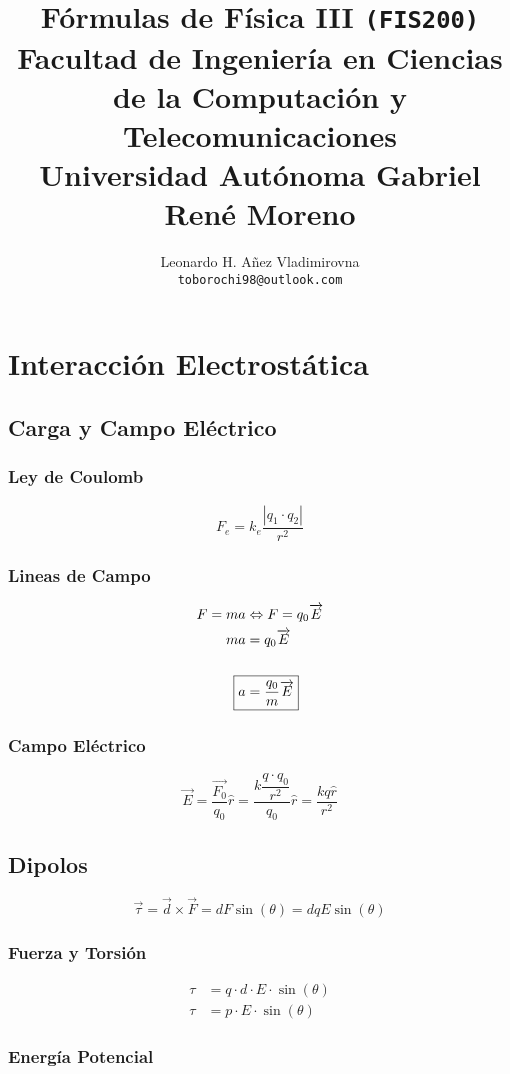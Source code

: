 \documentclass[10pt,letterpaper]{article}
\author{Leonardo H. Añez Vladimirovna\\
\texttt{toborochi98@outlook.com}
}
\title{Fórmulas de Física III \texttt{(FIS200)}\\{\normalsize Facultad de Ingeniería en Ciencias de la Computación y Telecomunicaciones}\\{\normalsize Universidad Autónoma Gabriel René Moreno}}
\begin{document}
\maketitle
\section{Interacción Electrostática}
\subsection{Carga y Campo Eléctrico}

\begin{multicols}{3}
\subsubsection{Ley de Coulomb}
$$
F_e = k_e \dfrac{|q_1\cdot q_2|}{r^2}
$$
\columnbreak
\subsubsection{Lineas de Campo}
\begin{align*}
F=ma & \Leftrightarrow  F=q_0 \overrightarrow{E}\\
ma &=q_0 \overrightarrow{E} \\ \vspace{0.01cm}\\
\Aboxed{a&=\dfrac{q_0}{m}\overrightarrow{E}}
\end{align*}
\columnbreak
\subsubsection{Campo Eléctrico}
$$
\overrightarrow{E}=\dfrac{\overrightarrow{F_0}}{q_0}\widehat{r}=\dfrac{k\dfrac{q\cdot q_0}{r^2}}{q_0}\widehat{r}=\dfrac{kq\widehat{r}}{r^2}
$$
\end{multicols}
\subsection{Dipolos}
$$
\overrightarrow{\tau}=\overrightarrow{d} \times \overrightarrow{F}=dF\sin(\theta)=dqE\sin(\theta)
$$
\begin{multicols}{2}
\subsubsection{Fuerza y Torsión}
\begin{align*}
\tau &= q\cdot d\cdot E\cdot\sin(\theta) \\
\tau &= p\cdot E\cdot\sin(\theta)
\end{align*}

\columnbreak
\subsubsection{Energía Potencial}
\end{multicols}
\end{document}
